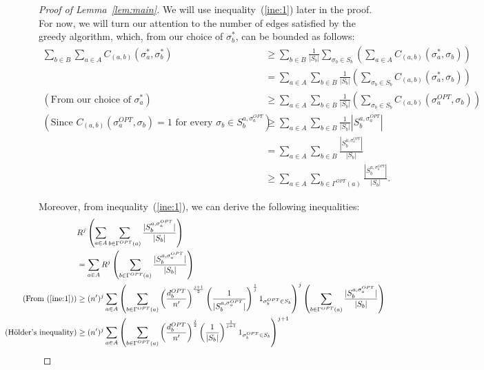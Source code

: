 \documentclass{article}
\begin{document}
\begin{proof}[Proof of Lemma~\ref{lem:main}]
We will use inequality~(\ref{ine:1}) later in the proof. For now, we will turn our attention to the number of edges satisfied by the greedy algorithm, which, from our choice of $\sigma^*_b$, can be bounded as follows:
\begin{align*}
  \sum_{b \in B} \sum_{a \in A} C_{(a, b)}(\sigma^*_a, \sigma^*_b) &\geq \sum_{b \in B} \frac{1}{|S_b|} \sum_{\sigma_b \in S_b} \left(\sum_{a \in A} C_{(a, b)}(\sigma^*_a, \sigma_b)\right) \\
  &= \sum_{a \in A} \sum_{b \in B} \frac{1}{|S_b|} \left(\sum_{\sigma_b \in S_b} C_{(a, b)}(\sigma^*_a, \sigma_b)\right) \\
  (\text{From our choice of } \sigma_a^*) &\geq \sum_{a \in A} \sum_{b \in B} \frac{1}{|S_b|} \left(\sum_{\sigma_b \in S_b} C_{(a, b)}(\sigma^{OPT}_a, \sigma_b)\right) \\
  (\text{Since } C_{(a, b)}(\sigma^{OPT}_a, \sigma_b) = 1 \text{ for every } \sigma_b \in S^{a, \sigma^{OPT}_a}_b)&\geq \sum_{a \in A} \sum_{b \in B} \frac{1}{|S_b|} |S^{a, \sigma^{OPT}_a}_b| \\
  &= \sum_{a \in A} \sum_{b \in B} \frac{|S^{a, \sigma^{OPT}_a}_b|}{|S_b|} \\
  &\geq \sum_{a \in A} \sum_{b \in \Gamma^{OPT}(a)} \frac{|S^{a, \sigma^{OPT}_a}_b|}{|S_b|}.
\end{align*}

Moreover, from inequality~(\ref{ine:1}), we can derive the following inequalities:
\begin{align*}
  \hspace*{-1.5cm} &R^j\left(\sum_{a \in A} \sum_{b \in \Gamma^{OPT}(a)} \frac{|S^{a, \sigma^{OPT}_a}_b|}{|S_b|}\right) \\
  \hspace*{-1.5cm} &= \sum_{a \in A} R^j \left(\sum_{b \in \Gamma^{OPT}(a)} \frac{|S^{a, \sigma^{OPT}_a}_b|}{|S_b|}\right) \\
  \hspace*{-1.5cm} (\text{From~(\ref{ine:1}})) &\geq (n')^j \sum_{a \in A} \left(\sum_{b \in \Gamma^{OPT}(a)} \left(\frac{d^{OPT}_b}{n'}\right)^\frac{j+1}{2}\left(\frac{1}{|S^{a, \sigma^{OPT}_a}_b|}\right)^\frac{1}{j}1_{\sigma_b^{OPT} \in S_b}\right)^j \left(\sum_{b \in \Gamma^{OPT}(a)} \frac{|S^{a, \sigma^{OPT}_a}_b|}{|S_b|}\right) \\
  \hspace*{-1.5cm} (\text{H\"{o}lder's inequality}) &\geq (n')^j \sum_{a \in A} \left(\sum_{b \in \Gamma^{OPT}(a)} \left(\frac{d^{OPT}_b}{n'}\right)^\frac{j}{2}\left(\frac{1}{|S_b|}\right)^\frac{1}{j+1}1_{\sigma_b^{OPT} \in S_b}\right)^{j+1}
\end{align*}


\end{proof}
\end{document}
